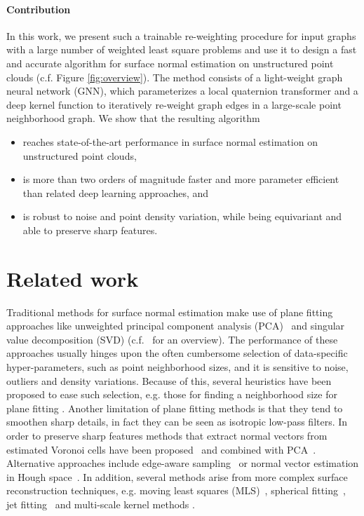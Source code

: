 \documentclass[10pt,twocolumn,letterpaper]{article}
\begin{document}
\paragraph{Contribution}
In this work, we present such a trainable re-weighting procedure for input graphs with a large number of weighted least square problems and use it to design a fast and accurate algorithm for surface normal estimation on unstructured point clouds (c.f. Figure \ref{fig:overview}). The method consists of a light-weight graph neural network (GNN), which parameterizes a local quaternion transformer and a deep kernel function to iteratively re-weight graph edges in a large-scale point neighborhood graph. We show that the resulting algorithm 

\begin{itemize}
  \setlength\itemsep{0em}
    \item reaches state-of-the-art performance in surface normal estimation on unstructured point clouds,
    \item is more than two orders of magnitude faster and more parameter efficient than related deep learning approaches, and
    \item is robust to noise and point density variation, while being equivariant and able to preserve sharp features.
    
\end{itemize}


\section{Related work}

Traditional methods for surface normal estimation make use of plane
fitting approaches like unweighted principal component analysis 
(PCA)~\cite{Hoppe:1992} and singular value decomposition (SVD) 
(c.f.~\cite{Klasing:2009} for an overview). 
The performance of these approaches usually hinges upon the often
cumbersome selection of data-specific hyper-parameters, such as
point neighborhood sizes, and it is sensitive to noise, outliers and
density variations.
Because of this, several heuristics have been proposed to ease such selection, e.g. those for finding a neighborhood size
for plane fitting \cite{Mitra:2004}. 
Another limitation of plane fitting methods is that they tend to smoothen sharp details, in fact they can be seen as
isotropic low-pass filters. 
In order to preserve sharp features methods that extract normal vectors 
from estimated Voronoi cells have been 
proposed~\cite{Amenta:1998,Merigot:2011} and combined 
with PCA~\cite{Alliez:2007}. 
Alternative approaches include edge-aware sampling~\cite{Huang:2013} or
normal vector estimation in Hough space~\cite{Boulch:2012}. In
addition, several methods arise from more complex surface reconstruction
techniques, e.g. moving least squares (MLS)~\cite{Levin:1998}, spherical fitting~\cite{Guennebaud:2007}, jet fitting~\cite{Cazals:2003} and multi-scale kernel methods \cite{Aroudj:2017}.
\end{document}
